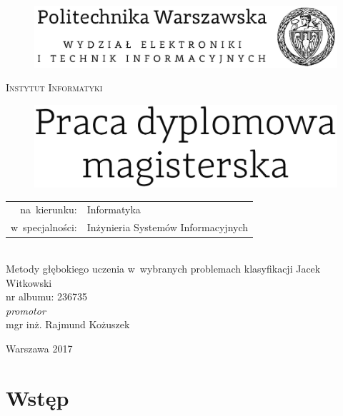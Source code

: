 \documentclass[a4paper,onecolumn,oneside,12pt,wide,floatssmall]{mwrep}
\begin{document}
\begin{titlepage}
  \begin{center}

    \begin{figure}[H]
	\centering
	\includegraphics[width=0.8\linewidth]{img/elka-logo.png}
    \end{figure}


    \textsc{\Large Instytut Informatyki}\\[4.0cm]

    \begin{figure}[H]
	\centering
	\includegraphics[width=0.8\linewidth]{img/pr-dyplomowa-text.png}
    \end{figure}
    \normalsize
    \begin{tabular}{rl}
      na~kierunku:& Informatyka \\
      w~specjalności:& Inżynieria Systemów Informacyjnych
     \end{tabular} \\[1.5cm]

    \Large Metody głębokiego uczenia w~wybranych problemach klasyfikacji
    \vfill
    \Huge Jacek Witkowski \\
    \normalsize nr albumu: 236735 \\[0.5cm]

    \normalsize \textit{promotor}\\
    mgr inż. Rajmund Kożuszek
    \vfill

    {\large Warszawa 2017}

  \end{center}
\end{titlepage}

\tableofcontents

\chapter{Wstęp}
\end{document}
